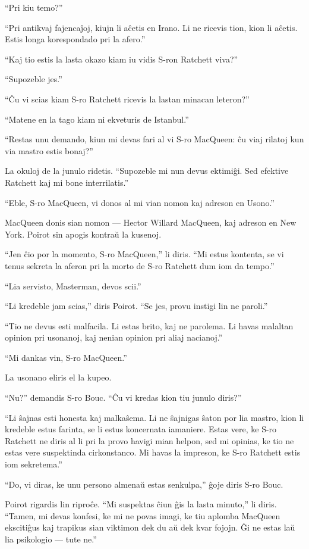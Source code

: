 ``Pri kiu temo?''

``Pri antikvaj fajencaĵoj, kiujn li aĉetis en Irano. Li ne ricevis tion, kion li aĉetis. Estis longa korespondado pri la afero.''

``Kaj tio estis la lasta okazo kiam iu vidis S-ron Ratchett viva?''

``Supozeble jes.''

``Ĉu vi scias kiam S-ro Ratchett ricevis la lastan minacan leteron?''

``Matene en la tago kiam ni ekveturis de Istanbul.''

``Restas unu demando, kiun mi devas fari al vi S-ro MacQueen: ĉu viaj rilatoj kun via mastro estis bonaj?''

La okuloj de la junulo ridetis. ``Supozeble mi nun devus ektimiĝi. Sed efektive Ratchett kaj mi bone interrilatis.''

``Eble, S-ro MacQueen, vi donos al mi vian nomon kaj adreson en Usono.''

MacQueen donis sian nomon --- Hector Willard MacQueen, kaj adreson en New York. Poirot sin apogis kontraŭ la kusenoj.

``Jen ĉio por la momento, S-ro MacQueen,'' li diris. ``Mi estus kontenta, se vi tenus sekreta la aferon pri la morto de S-ro Ratchett dum iom da tempo.''

``Lia servisto, Masterman, devos scii.''

``Li kredeble jam scias,'' diris Poirot. ``Se jes, provu instigi lin ne paroli.''

``Tio ne devus esti malfacila. Li estas brito, kaj ne parolema. Li havas malaltan opinion pri usonanoj, kaj nenian opinion pri aliaj nacianoj.''

``Mi dankas vin, S-ro MacQueen.''

La usonano eliris el la kupeo.

``Nu?'' demandis S-ro Bouc. ``Ĉu vi kredas kion tiu junulo diris?''

``Li ŝajnas esti honesta kaj malkaŝema. Li ne ŝajnigas ŝaton por lia mastro, kion li kredeble estus farinta, se li estus koncernata iamaniere. Estas vere, ke S-ro Ratchett ne diris al li pri la provo havigi mian helpon, sed mi opinias, ke tio ne estas vere suspektinda cirkonstanco. Mi havas la impreson, ke S-ro Ratchett estis iom sekretema.''

``Do, vi diras, ke unu persono almenaŭ estas senkulpa,'' ĝoje diris S-ro Bouc.

Poirot rigardis lin riproĉe. ``Mi suspektas ĉiun ĝis la lasta minuto,'' li diris. ``Tamen, mi devas konfesi, ke mi ne povas imagi, ke tiu aplomba MacQueen ekscitiĝus kaj trapikus sian viktimon dek du aŭ dek kvar fojojn. Ĝi ne estas laŭ lia psikologio --- tute ne.''

